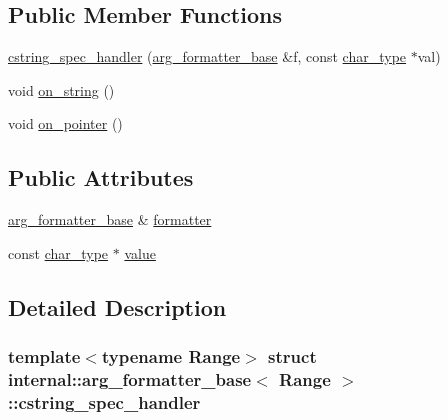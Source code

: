 \subsection*{Public Member Functions}
\begin{DoxyCompactItemize}
\item 
\hyperlink{structinternal_1_1arg__formatter__base_1_1cstring__spec__handler_a68f8ea1336be7618f860765343065e12}{cstring\+\_\+spec\+\_\+handler} (\hyperlink{classinternal_1_1arg__formatter__base}{arg\+\_\+formatter\+\_\+base} \&f, const \hyperlink{classinternal_1_1arg__formatter__base_a407930bf282880d2ca45dfa8f5d2034b}{char\+\_\+type} $\ast$val)
\item 
void \hyperlink{structinternal_1_1arg__formatter__base_1_1cstring__spec__handler_a3da22ca8cba834e783cfe8f3226efd36}{on\+\_\+string} ()
\item 
void \hyperlink{structinternal_1_1arg__formatter__base_1_1cstring__spec__handler_a75eea1de2c0b04276ecd79aa439aec60}{on\+\_\+pointer} ()
\end{DoxyCompactItemize}
\subsection*{Public Attributes}
\begin{DoxyCompactItemize}
\item 
\hyperlink{classinternal_1_1arg__formatter__base}{arg\+\_\+formatter\+\_\+base} \& \hyperlink{structinternal_1_1arg__formatter__base_1_1cstring__spec__handler_af912858b1370073e2e1a525dcd2bf923}{formatter}
\item 
const \hyperlink{classinternal_1_1arg__formatter__base_a407930bf282880d2ca45dfa8f5d2034b}{char\+\_\+type} $\ast$ \hyperlink{structinternal_1_1arg__formatter__base_1_1cstring__spec__handler_a9aa3e2164e2360a14f7337c85857643c}{value}
\end{DoxyCompactItemize}


\subsection{Detailed Description}
\subsubsection*{template$<$typename Range$>$\newline
struct internal\+::arg\+\_\+formatter\+\_\+base$<$ Range $>$\+::cstring\+\_\+spec\+\_\+handler}



